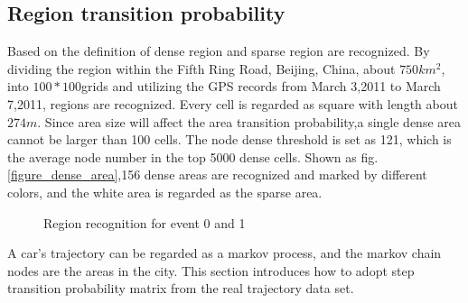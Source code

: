 \subsection{Region transition probability}


Based on the definition of dense region and sparse region are recognized. By dividing the region within the Fifth Ring Road, Beijing, China, about $750 km^2$, into $100*100$grids and utilizing the GPS records from March 3,2011 to March 7,2011, regions are recognized. Every cell is regarded as square with length about $274m$. Since area size will affect the area transition probability,a single dense area cannot be larger than 100 cells.
The node dense threshold is set as 121, which is the average node number in the top 5000 dense cells.  Shown as  fig.\ref{figure_dense_area},156 dense areas are recognized and marked by different colors, and the white area is regarded as the sparse area.



\begin{figure}[!h]
\centering
{}
\caption{Region recognition for event 0 and 1}\label{figure_region_recognizition}
\end{figure}


A car's trajectory can be regarded as a markov process, and the markov chain nodes are the areas in the city.
This section introduces how to adopt step transition probability matrix from the real trajectory data set.

